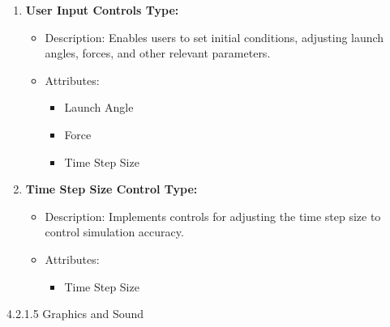 \documentclass[
]{article}
\begin{document}
\begin{enumerate}
\def\labelenumi{\arabic{enumi}.}
\setcounter{enumi}{8}
\item
  \textbf{User Input Controls Type:}

  \begin{itemize}
  \item
    Description: Enables users to set initial conditions, adjusting
    launch angles, forces, and other relevant parameters.
  \item
    Attributes:

    \begin{itemize}
    \item
      Launch Angle
    \item
      Force
    \item
      Time Step Size
    \end{itemize}
  \end{itemize}
\item
  \textbf{Time Step Size Control Type:}

  \begin{itemize}
  \item
    Description: Implements controls for adjusting the time step size to
    control simulation accuracy.
  \item
    Attributes:

    \begin{itemize}
    \item
      Time Step Size
    \end{itemize}
  \end{itemize}
\end{enumerate}

4.2.1.5 Graphics and Sound
\end{document}
